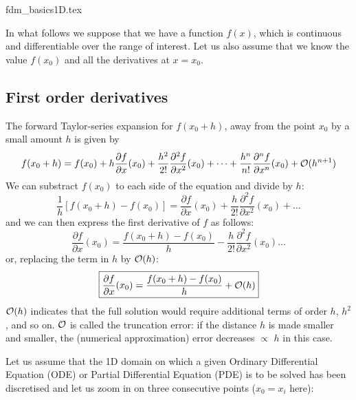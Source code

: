 \begin{flushright} {\tiny {\color{gray} fdm\_basics1D.tex}} \end{flushright}

In what follows we suppose that we have a function $f(x)$, 
which is continuous and differentiable over the range of interest. 
Let us also assume that we know the value $f(x_0)$ and all the derivatives at $x = x_0$. 

\subsection{First order derivatives}

The forward Taylor-series expansion for $f(x_0 + h)$, away 
from the point $x_0$ by a small amount $h$ is given by
\begin{equation}
f(x_0+h)=f(x_0)+ 
h \frac{\partial f}{\partial x}(x_0)  + 
\frac{h^2}{2!} \frac{\partial^2 f}{\partial x^2}(x_0)  +
\dots  +
\frac{h^n}{n!} \frac{\partial^n f}{\partial x^n}(x_0)  
+ {\cal O}(h^{n+1})
\end{equation}
We can substract $f(x_0)$ to each side of the equation and divide by $h$:
\begin{equation}
\frac{1}{h} \left[f(x_0+h)-f(x_0)\right] = 
 \frac{\partial f}{\partial x}(x_0)  + 
\frac{h}{2!} \frac{\partial^2 f}{\partial x^2}(x_0)  + \dots 
\end{equation}
and we can then express the first derivative of $f$ as follows:
\begin{equation}
\frac{\partial f}{\partial x}(x_0) = \frac{f(x_0+h)-f(x_0)}{h} - 
\frac{h}{2!} \frac{\partial^2 f}{\partial x^2}(x_0)  \dots
\end{equation}
or, replacing the term in $h$ by ${\cal O}(h)$:
\begin{equation}
\boxed{
\frac{\partial f}{\partial x}(x_0) = \frac{f(x_0+h)-f(x_0)}{h} + {\cal O}(h)
}
\end{equation}
${\cal O}(h)$ indicates that the full solution would require additional terms of order $h$, $h^2$, 
and so on. ${\cal O}$ is called the {\color{olive}truncation error}: if the distance $h$ 
is made smaller and smaller, the (numerical approximation) error decreases $\propto$ $h$ in this case.


Let us assume that the 1D domain on which a given Ordinary Differential 
Equation (ODE) or Partial Differential Equation (PDE) is to be solved has been discretised
and let us zoom in on three consecutive points ($x_0=x_i$ here):

